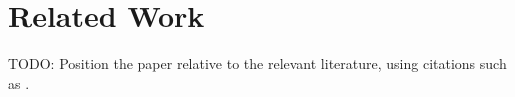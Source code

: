 \section{Related Work}
\label{sec:related-work}

TODO: Position the paper relative to the relevant literature, using citations
such as \citet{kingma2014autoencoding}.
